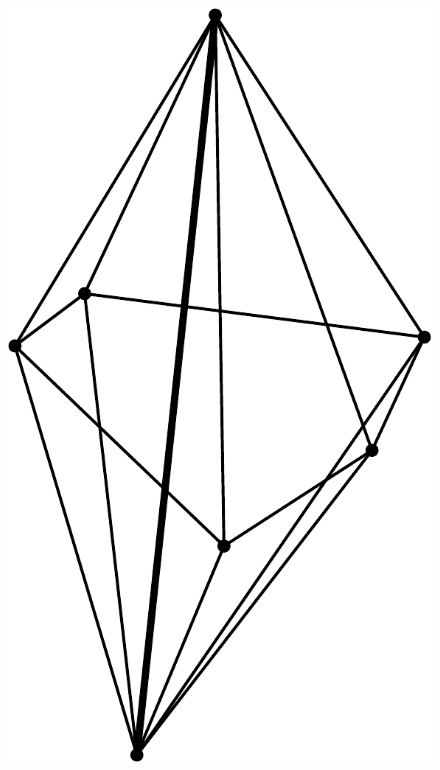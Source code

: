 \begin{figure}
  \centering
  \includegraphics[width=\twofigs]{chapters/hoffman-2/pdf/swap.pdf}

\end{figure}
